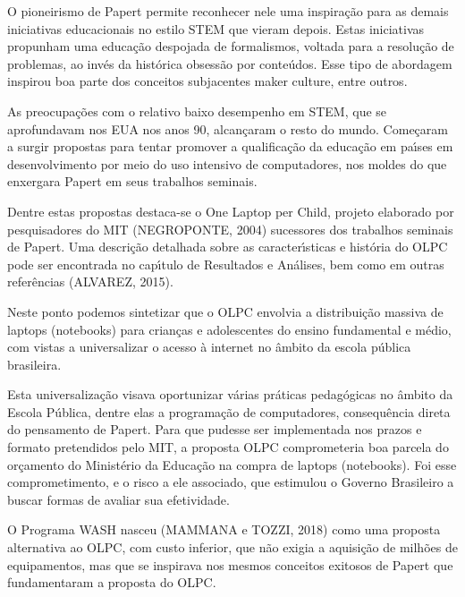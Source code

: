 \documentclass[
12pt,		%
openright,	%
twoside,  %
a4paper,			%
chapter=TITLE,		%
english,			%
french,				%
spanish,			%
brazil				%
]{USPSC-classe/USPSC}
\begin{document}
O pioneirismo de Papert permite reconhecer nele uma inspira\c{c}\~ao para as demais iniciativas educacionais no estilo STEM que vieram depois. Estas iniciativas propunham uma educa\c{c}\~ao despojada de formalismos, voltada para a resolu\c{c}\~ao de problemas, ao inv\'es da hist\'orica obsess\~ao por conte\'udos. Esse tipo de abordagem inspirou boa parte dos conceitos subjacentes  \textquotedbl maker culture\textquotedbl , entre outros.




As preocupa\c{c}\~oes com o relativo baixo desempenho em STEM, que se aprofundavam nos EUA nos anos 90, alcan\c{c}aram o resto do mundo. Come\c{c}aram a surgir propostas para tentar promover a qualifica\c{c}\~ao da educa\c{c}\~ao em pa\'{\i}ses em desenvolvimento por meio do uso intensivo de computadores, nos moldes do que enxergara Papert em seus trabalhos seminais.




Dentre estas propostas destaca-se o \textquotedbl One Laptop per Child\textquotedbl , projeto elaborado por pesquisadores do MIT  (NEGROPONTE, 2004)  sucessores dos trabalhos seminais de Papert. Uma descri\c{c}\~ao detalhada sobre as caracter\'{\i}sticas e hist\'oria do OLPC pode ser encontrada no cap\'{\i}tulo de Resultados e An\'alises, bem como em outras refer\^encias  (ALVAREZ, 2015).




Neste ponto podemos sintetizar que o OLPC envolvia a distribui\c{c}\~ao massiva de laptops (notebooks) para crian\c{c}as e adolescentes do  ensino fundamental e m\'edio, com vistas a universalizar o acesso \`a internet no \^ambito da escola p\'ublica brasileira.




Esta universaliza\c{c}\~ao visava oportunizar v\'arias pr\'aticas pedag\'ogicas no \^ambito da Escola P\'ublica, dentre elas a programa\c{c}\~ao de computadores, consequ\^encia direta do pensamento de Papert. Para que pudesse ser implementada nos prazos e formato pretendidos pelo MIT, a proposta OLPC comprometeria boa parcela do or\c{c}amento do Minist\'erio da Educa\c{c}\~ao na compra de laptops (notebooks). Foi esse comprometimento, e o risco a ele associado, que estimulou o Governo Brasileiro a buscar formas de avaliar sua efetividade.




O Programa WASH nasceu  (MAMMANA e TOZZI, 2018)  como uma proposta alternativa ao OLPC, com custo inferior, que n\~ao exigia a aquisi\c{c}\~ao de milh\~oes de equipamentos, mas que se inspirava nos mesmos conceitos exitosos de Papert que fundamentaram a proposta do OLPC.
\end{document}
